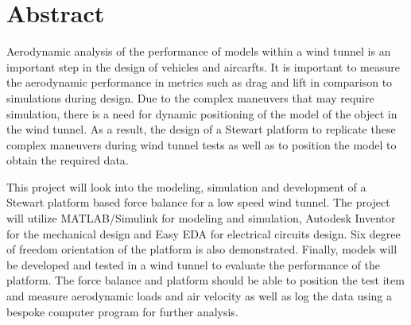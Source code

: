 
\section*{Abstract}
\label{sec:Abstract}
Aerodynamic analysis of the performance of models within a wind tunnel is an important step in the design of vehicles and aircarfts. It is important to measure the aerodynamic performance in metrics such as drag and lift in comparison to simulations during design.
Due to the complex maneuvers that may require simulation, there is a need for dynamic positioning of the model of the object in the wind tunnel. As a result, the design of a Stewart platform to replicate these complex maneuvers during wind tunnel tests as well as to position the model to obtain the required data.

This project will look into the modeling, simulation and development of a Stewart
platform based force balance for a low speed wind tunnel. The project will utilize
MATLAB/Simulink for modeling and simulation, Autodesk Inventor for the mechanical
design and Easy EDA for electrical circuits design. Six degree of freedom orientation of the platform is also demonstrated. 
Finally, models will be developed and tested in a wind tunnel to evaluate the performance
of the platform. The force balance and platform should be able to position the test
item and measure aerodynamic loads and air velocity as well as log the data using a bespoke computer program for further analysis.




